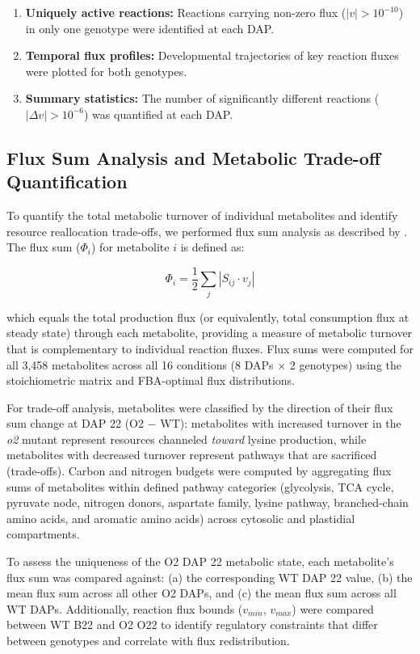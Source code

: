 \documentclass[12pt,a4paper]{article}
\begin{document}
\begin{enumerate}
    \item \textbf{Uniquely active reactions:} Reactions carrying non-zero flux ($|v| > 10^{-10}$) in only one genotype were identified at each DAP.
    
    \item \textbf{Temporal flux profiles:} Developmental trajectories of key reaction fluxes were plotted for both genotypes.
    
    \item \textbf{Summary statistics:} The number of significantly different reactions ($|\Delta v| > 10^{-6}$) was quantified at each DAP.
\end{enumerate}

\subsection{Flux Sum Analysis and Metabolic Trade-off Quantification}

To quantify the total metabolic turnover of individual metabolites and identify resource reallocation trade-offs, we performed flux sum analysis as described by \citet{Kim2012}. The flux sum ($\Phi_i$) for metabolite $i$ is defined as:

\begin{equation}
    \Phi_i = \frac{1}{2} \sum_{j} |S_{ij} \cdot v_j|
\end{equation}

which equals the total production flux (or equivalently, total consumption flux at steady state) through each metabolite, providing a measure of metabolic turnover that is complementary to individual reaction fluxes. Flux sums were computed for all 3,458 metabolites across all 16 conditions (8 DAPs $\times$ 2 genotypes) using the stoichiometric matrix and FBA-optimal flux distributions.

For trade-off analysis, metabolites were classified by the direction of their flux sum change at DAP 22 (O2 $-$ WT): metabolites with increased turnover in the \textit{o2} mutant represent resources channeled \textit{toward} lysine production, while metabolites with decreased turnover represent pathways that are sacrificed (trade-offs). Carbon and nitrogen budgets were computed by aggregating flux sums of metabolites within defined pathway categories (glycolysis, TCA cycle, pyruvate node, nitrogen donors, aspartate family, lysine pathway, branched-chain amino acids, and aromatic amino acids) across cytosolic and plastidial compartments.

To assess the uniqueness of the O2 DAP 22 metabolic state, each metabolite's flux sum was compared against: (a) the corresponding WT DAP 22 value, (b) the mean flux sum across all other O2 DAPs, and (c) the mean flux sum across all WT DAPs. Additionally, reaction flux bounds ($v_{min}$, $v_{max}$) were compared between WT B22 and O2 O22 to identify regulatory constraints that differ between genotypes and correlate with flux redistribution.
\end{document}

